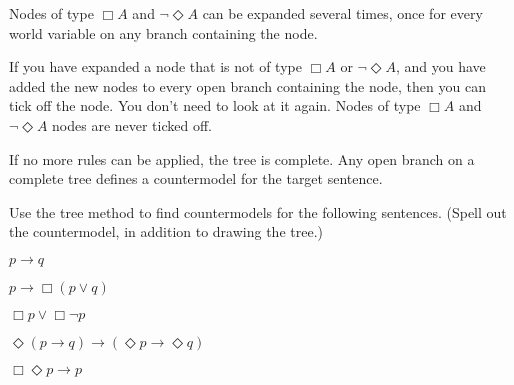 Nodes of type $\Box A$ and $\neg \Diamond A$ can be expanded several times, once
for every world variable on any branch containing the node.

If you have expanded a node that is not of type $\Box A$ or $\neg \Diamond A$,
and you have added the new nodes to every open branch containing the node, then
you can tick off the node. You don't need to look at it again. Nodes of type
$\Box A$ and $\neg \Diamond A$ nodes are never ticked off.

If no more rules can be applied, the tree is complete. Any open branch on a
complete tree defines a countermodel for the target sentence.
%
\begin{exercise}
  Use the tree method to find countermodels for the following
  sentences. (Spell out the countermodel, in addition to drawing the tree.)
  \begin{exlist}
  \item $p\to q$ 
  \item $p \to \Box(p \lor q)$
  \item $\Box p \lor \Box \neg p$
  \item $\Diamond(p \to q) \to (\Diamond p \to \Diamond q)$
  \item $\Box \Diamond p \to p$ %
  \end{exlist}
\end{exercise}
